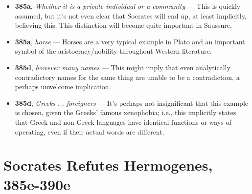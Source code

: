 \documentclass[12pt]{article}
\begin{document}
\begin{itemize}
\item \textbf{385a}, \textit{Whether it is a private individual or a community} --- This is quickly assumed, but it's not even clear that Socrates will end up, at least implicitly, believing this. This distinction will become quite important in Saussure.

\item \textbf{385a}, \textit{horse} --- Horses are a very typical example in Plato and an important symbol of the aristocracy/nobility throughout Western literature.

\item \textbf{385d}, \textit{however many names} --- This might imply that even analytically contradictory names for the same thing are unable to be a contradiction, a perhaps unwelcome implication.

\item \textbf{385d}, \textit{Greeks ... foreigners} --- It's perhaps not insignificant that this example is chosen, given the Greeks' famous xenophobia; i.e., this implicitly states that Greek and non-Greek languages have identical functions or ways of operating, even if their actual words are different.

\end{itemize}

\section{Socrates Refutes Hermogenes, 385e-390e}
\end{document}
